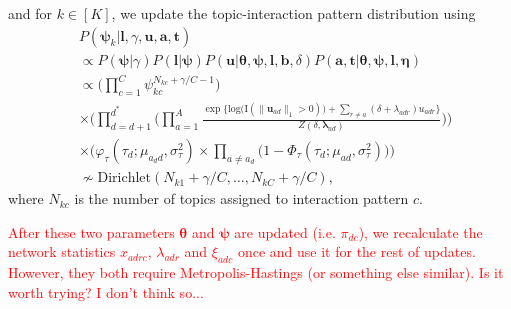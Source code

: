 \documentclass{article}
\begin{document}
and for $k \in [K]$, we update the topic-interaction pattern distribution using 
\begin{equation}
\begin{aligned}
&P(\boldsymbol{\psi}_{k}|\boldsymbol{l},  \gamma,\boldsymbol{u},  \boldsymbol{a},  \boldsymbol{t})
\\&\propto P(\boldsymbol{\psi}|\gamma)P(\boldsymbol{l}|\boldsymbol{\psi})P(\boldsymbol{u}|\boldsymbol{\theta},\boldsymbol{\psi},\boldsymbol{l}, \boldsymbol{b}, \delta)P(\boldsymbol{a}, \boldsymbol{t}|\boldsymbol{\theta},\boldsymbol{\psi}, \boldsymbol{l},\boldsymbol{\eta})
\\&\propto\Big(\prod_{c=1}^{C} \psi_{kc}^{N_{kc}+\gamma/C - 1}\Big)\\&\times\Big(\prod_{d=d+1}^{d^*}\Big(
\prod_{a=1}^A \frac{\exp\Big\{\mbox{log}\big(\text{I}( \lVert \boldsymbol{u}_{ad}\rVert_1 > 0)\big) + \sum\limits_{r \neq a} (\delta+\lambda_{adr})u_{adr}\Big\}}{Z(\delta,\boldsymbol{\lambda}_{ad})}\Big)\Big)
\\&\times\Big(\varphi_{\tau}(\tau_{d}; \mu_{a_d d}, \sigma_\tau^2)\times \prod_{a\neq a_d}\big(1-\Phi_{\tau}(\tau_{d}; \mu_{a d}, \sigma_\tau^2) \big)\Big)\\
& \nsim  \mbox{Dirichlet}(N_{k1}+ \gamma/C,\ldots, N_{kC} + \gamma/C),
\end{aligned}
\end{equation}
where $N_{kc}$ is the number of topics assigned to interaction pattern $c$.

\textcolor{red}{After these two parameters $\boldsymbol{\theta}$ and $\boldsymbol{\psi}$ are updated (i.e. $\pi_{dc}$), we recalculate the network statistics $x_{adrc}$, $\lambda_{adr}$ and $\xi_{adc}$ once and use it for the rest of updates. However, they both require Metropolis-Hastings (or something else similar). Is it worth trying? I don't think so...}

\end{document}
